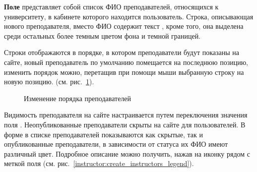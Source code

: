 \textbf{Поле } представляет собой список ФИО преподавателей, относящихся к университету, в кабинете которого находится пользователь. Строка, описывающая нового преподавателя, вместо ФИО содержит текст , кроме того, она выделена среди остальных более темным цветом фона и темной границей.


Строки отображаются в порядке, в котором преподаватели будут показаны на сайте, новый преподаватель по умолчанию помещается на последнюю позицию, изменить порядок можно, перетащив  при помощи мыши выбранную строку на новую позицию. (см. рис.~\ref{instructor:create_instructors}).
		
		\begin{figure}[H]
		\caption{Изменение порядка преподавателей}
		\label{instructor:create_instructors}
		\end{figure}	
		
Видимость преподавателя на сайте настраивается путем переключения значения поля . Неопубликованные преподаватели скрыты на сайте для пользователей. В форме в списке преподавателей показываются как скрытые, так и опубликованные преподаватели, в зависимости от статуса их ФИО имеют различный цвет. Подробное описание можно получить, нажав на иконку  рядом с меткой поля (см. рис.~\ref{instructor:create_instructors_legend}).
		
